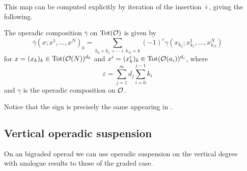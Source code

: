 \documentclass[join.tex]{subfiles}
\begin{document}
This map can be computed explicitly by iteration of the insertion $\bar{\circ}$, giving the following.  %

\begin{lem}\label{totcomp}
The operadic composition $\bar{\gamma}$ on $\mathrm{Tot}({\mathcal O})$ is given by
\begin{equation*}%
\bar{\gamma}(x;x^1,\dots, x^N)_k=\sum_{k_0+k_1+\cdots+k_N=k}(-1)^{\varepsilon}\gamma(x_{k_0};x^1_{k_1},\dots, x^N_{k_N})
\end{equation*}
for $x=(x_k)_k\in\mathrm{Tot}({\mathcal O}(N))^{d_0}$ and $x^i=(x^i_k)_k\in\mathrm{Tot}({\mathcal O}(a_i))^{d_i}$, where 
\begin{equation}
\varepsilon=\sum_{j=1}^m d_j\sum_{i=0}^{j-1}k_i
\end{equation}
and $\gamma$ is the operadic composition on ${\mathcal O}$.
\end{lem}
Notice that the sign is precisely the same appearing in .




\subsection{Vertical operadic suspension}
On an bigraded operad we can use operadic suspension on the vertical degree with analogue results to those of the graded case. %



\end{document}
